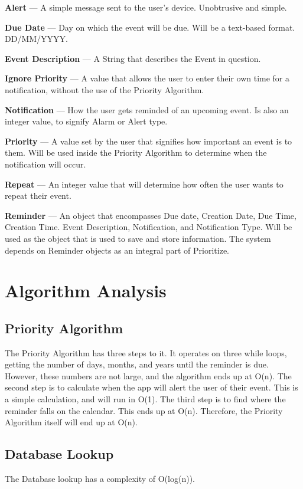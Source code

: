 \documentclass[12pt]{article}
\begin{document}
\textbf{Alert} --- A simple message sent to the user's device. Unobtrusive and simple.

\textbf{Due Date} --- Day on which the event will be due. Will be a text-based format. DD/MM/YYYY.

\textbf{Event Description} --- A String that describes the Event in question.

\textbf{Ignore Priority} --- A value that allows the user to enter their own time for a notification, without the use of the Priority Algorithm.

\textbf{Notification} --- How the user gets reminded of an upcoming event. Is also an integer value, to signify Alarm or Alert type.

\textbf{Priority} --- A value set by the user that signifies how important an event is to them. Will be used inside the Priority Algorithm to determine when the notification will occur.

\textbf{Repeat} --- An integer value that will determine how often the user wants to repeat their event.

\textbf{Reminder} --- An object that encompasses Due date, Creation Date, Due Time, Creation Time. Event Description, Notification, and Notification Type. Will be used as the object that is used to save and store information. The system depends on Reminder objects as an integral part of Prioritize.



\section{Algorithm Analysis}
\subsection{Priority Algorithm}
The Priority Algorithm has three steps to it. It operates on three while loops, getting the number of days, months, and years until the reminder is due. However, these numbers are not large, and the algorithm ends up at O(n). The second step is to calculate when the app will alert the user of their event. This is a simple calculation, and will run in O(1). The third step is to find where the reminder falls on the calendar. This ends up at O(n). Therefore, the Priority Algorithm itself will end up at O(n).

\subsection{Database Lookup}
The Database lookup has a complexity of O(log(n)).
\end{document}
